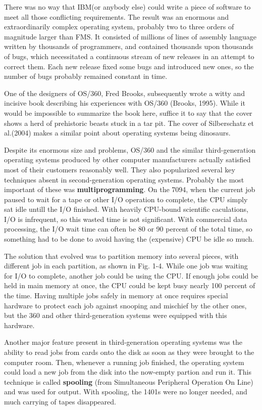 \documentclass{book}
\newcommand {\kw}  [1] {\textbf{#1}}
\begin{document}
There was no way that IBM(or anybody else) could write a piece of software to meet all those conflicting requirements.
The result was an enormous and extraordinarily complex operating system, probably two to three orders of magnitude larger than FMS.
It consisted of millions of lines of assembly language written by thousands of programmers, 
and contained thousands upon thousands of bugs, which necessitated a continuous stream of new releases in an attempt to correct them.
Each new release fixed some bugs and introduced new ones, so the number of bugs probably remained constant in time.

One of the designers of OS/360, Fred Brooks, subsequently wrote a witty and incisive book describing his experiences with OS/360 (Brooks, 1995).
While it would be impossible to summarize the book here, suffice it to say that the cover shows a herd of prehistoric beasts stuck in a tar pit.
The cover of Silberschatz et al.(2004) makes a similar point about operating systems being dinosaurs.

Despite its enormous size and problems, OS/360 and the similar third-generation operating systems produced by other computer manufacturers 
actually satisfied most of their customers reasonably well.
They also popularized several key techniques absent in second-generation operating systems.
Probably the most important of these was \kw{multiprogramming}.
On the 7094, when the current job paused to wait for a tape or other I/O operation to complete, the CPU simply sat idle untill the I/O finished.
With heavily CPU-bound scientific caculations, I/O is infrequent, so this wasted time is not significant.
With commercial data processing, the I/O wait time can often be 80 or 90 percent of the total time, 
so something had to be done to avoid having the (expensive) CPU be idle so much.

The solution that evolved was to partition memory into several pieces, with different job in each partition, as shown in Fig. 1-4.
While one job was waiting for I/O to complete, another job could be using the CPU.
If enough jobs could be held in main memory at once, the CPU could be kept busy nearly 100 percent of the time.
Having multiple jobs safely in memory at once requires special hardware to protect each job against snooping and mischief by the other ones,
but the 360 and other third-generation systems were equipped with this hardware.

Another major feature present in third-generation operating systems was the ability to read jobs from cards onto the disk 
as soon as they were brought to the computer room.
Then, whenever a running job finished, the operating system could load a new job from the disk into the now-empty partion and run it.
This technique is called \kw{spooling} (from Simultaneous Peripheral Operation On Line) and was used for output.
With spooling, the 1401s were no longer needed, and much carrying of tapes disappeared.
\end{document}
